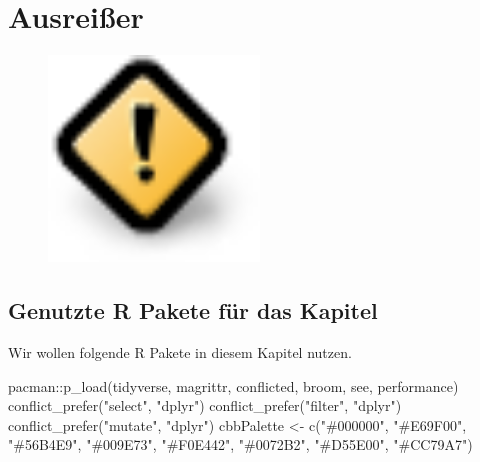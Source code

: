 \documentclass[
  letterpaper,
]{scrbook}
\newenvironment{Shaded}{\begin{snugshade}}{\end{snugshade}}
\newcommand{\FunctionTok}[1]{\textcolor[rgb]{0.28,0.35,0.67}{#1}}
\newcommand{\NormalTok}[1]{\textcolor[rgb]{0.00,0.23,0.31}{#1}}
\newcommand{\OtherTok}[1]{\textcolor[rgb]{0.00,0.23,0.31}{#1}}
\newcommand{\SpecialCharTok}[1]{\textcolor[rgb]{0.37,0.37,0.37}{#1}}
\newcommand{\StringTok}[1]{\textcolor[rgb]{0.13,0.47,0.30}{#1}}
\begin{document}
\hypertarget{ausreiuxdfer}{%
\chapter{Ausreißer}\label{ausreiuxdfer}}

\begin{figure}

{\centering \includegraphics[width=0.5\textwidth,height=\textheight]{./images/caution.png}

}

\end{figure}

\hypertarget{genutzte-r-pakete-fuxfcr-das-kapitel-20}{%
\section{Genutzte R Pakete für das
Kapitel}\label{genutzte-r-pakete-fuxfcr-das-kapitel-20}}

Wir wollen folgende R Pakete in diesem Kapitel nutzen.

\begin{Shaded}
\begin{Highlighting}[]
\NormalTok{pacman}\SpecialCharTok{::}\FunctionTok{p\_load}\NormalTok{(tidyverse, magrittr, conflicted, broom,}
\NormalTok{               see, performance)}
\FunctionTok{conflict\_prefer}\NormalTok{(}\StringTok{"select"}\NormalTok{, }\StringTok{"dplyr"}\NormalTok{)}
\FunctionTok{conflict\_prefer}\NormalTok{(}\StringTok{"filter"}\NormalTok{, }\StringTok{"dplyr"}\NormalTok{)}
\FunctionTok{conflict\_prefer}\NormalTok{(}\StringTok{"mutate"}\NormalTok{, }\StringTok{"dplyr"}\NormalTok{)}
\NormalTok{cbbPalette }\OtherTok{\textless{}{-}} \FunctionTok{c}\NormalTok{(}\StringTok{"\#000000"}\NormalTok{, }\StringTok{"\#E69F00"}\NormalTok{, }\StringTok{"\#56B4E9"}\NormalTok{, }\StringTok{"\#009E73"}\NormalTok{, }
                \StringTok{"\#F0E442"}\NormalTok{, }\StringTok{"\#0072B2"}\NormalTok{, }\StringTok{"\#D55E00"}\NormalTok{, }\StringTok{"\#CC79A7"}\NormalTok{)}
\end{Highlighting}
\end{Shaded}
\end{document}
